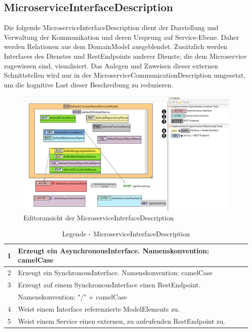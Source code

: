 \newpage
\subsection{MicroserviceInterfaceDescription}

Die folgende \glqq MicroserviceInterfaceDescription\grqq{} dient der Darstellung und Verwaltung der Kommunikation und deren Ursprung auf Service-Ebene. Daher werden Relationen aus dem DomainModel ausgeblendet. Zusätzlich werden Interfaces des Dienstes und RestEndpoints anderer Dienste, die dem Microservice zugewiesen sind, visualisiert. Das Anlegen und Zuweisen dieser externen Schnittstellen wird nur in der MicroserviceCommunicationDescription umgesetzt, um die kognitive Last dieser Beschreibung zu reduzieren.

\begin{figure}[ht]
\centering
\includegraphics[width=\textwidth]{bilder/k5/5.png}
\caption{Editoransicht der MicroserviceInterfaceDescription}
\end{figure}

\begin{table}[h]
\centering
\footnotesize
\begin{tabularx}{\textwidth}{|c|X|}
\hline
1 & Erzeugt ein AsynchronousInterface. Namenskonvention: camelCase\\ \hline
2 & Erzeugt ein SynchronousInterface. Namenskonvention: camelCase \\ \hline
3 & Erzeugt auf einem SynchronousInterface einen RestEndpoint.\\ & Namenskonvention: "/" + camelCase\\ \hline
4 & Weist einem Interface referenzierte ModelElements zu. \\ \hline
5 & Weist einem Service einen externen, zu aufrufenden RestEndpoint zu. \\ \hline
\end{tabularx}
\caption{Legende - MicroserviceInterfaceDescription}
\end{table}

